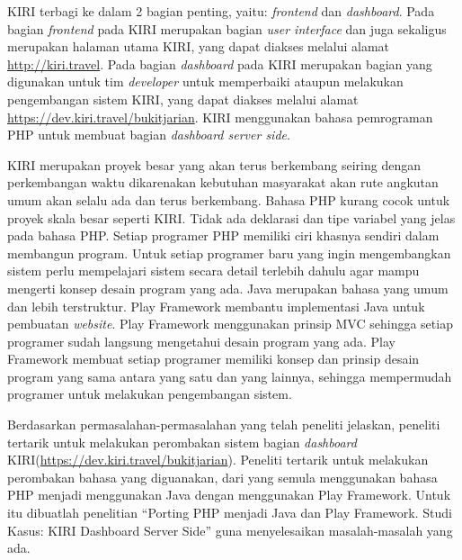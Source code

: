 KIRI terbagi ke dalam 2 bagian penting, yaitu: \textit{frontend} dan \textit{dashboard}. Pada bagian \textit{frontend} pada KIRI merupakan bagian \textit{user interface} dan juga sekaligus merupakan halaman utama KIRI, yang dapat diakses melalui alamat \href{http://kiri.travel}{http://kiri.travel}. Pada bagian \textit{dashboard} pada KIRI merupakan bagian yang digunakan untuk tim \textit{developer} untuk memperbaiki ataupun melakukan pengembangan sistem KIRI, yang dapat diakses melalui alamat \href{https://dev.kiri.travel/bukitjarian}{https://dev.kiri.travel/bukitjarian}. KIRI menggunakan bahasa pemrograman PHP untuk membuat bagian \textit{dashboard server side}.

KIRI merupakan proyek besar yang akan terus berkembang seiring dengan perkembangan waktu dikarenakan kebutuhan masyarakat akan rute angkutan umum akan selalu ada dan terus berkembang. Bahasa PHP kurang cocok untuk proyek skala besar seperti KIRI. Tidak ada deklarasi dan tipe variabel yang jelas pada bahasa PHP. Setiap programer PHP memiliki ciri khasnya sendiri dalam membangun program. Untuk setiap programer baru yang ingin mengembangkan sistem perlu mempelajari sistem secara detail terlebih dahulu agar mampu mengerti konsep desain program yang ada. Java merupakan bahasa yang umum dan lebih terstruktur. Play Framework membantu implementasi Java untuk pembuatan \textit{website}. Play Framework menggunakan prinsip MVC sehingga setiap programer sudah langsung mengetahui desain program yang ada. Play Framework membuat setiap programer memiliki konsep dan prinsip desain program yang sama antara yang satu dan yang lainnya, sehingga mempermudah programer untuk melakukan pengembangan sistem.

Berdasarkan permasalahan-permasalahan yang telah peneliti jelaskan, peneliti tertarik untuk melakukan perombakan sistem bagian \textit{dashboard} KIRI(\href{https://dev.kiri.travel/bukitjarian}{https://dev.kiri.travel/bukitjarian}). Peneliti tertarik untuk melakukan perombakan bahasa yang diguanakan, dari yang semula menggunakan bahasa PHP menjadi menggunakan Java dengan menggunakan Play Framework. Untuk itu dibuatlah penelitian ``Porting PHP menjadi Java dan Play Framework. Studi Kasus: KIRI Dashboard Server Side'' guna menyelesaikan masalah-masalah yang ada.

